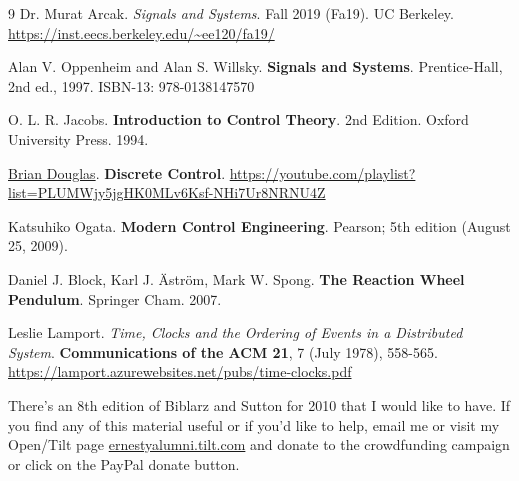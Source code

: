 \documentclass[10pt]{amsart}
\begin{document}
\begin{thebibliography}{9}
Dr. Murat Arcak. \emph{Signals and Systems}. Fall 2019 (Fa19). UC Berkeley. \url{https://inst.eecs.berkeley.edu/~ee120/fa19/}

Alan V. Oppenheim and Alan S. Willsky. \textbf{Signals and Systems}. Prentice-Hall, 2nd ed., 1997.  ISBN-13: 978-0138147570 

O. L. R. Jacobs. \textbf{Introduction to Control Theory}. 2nd Edition. Oxford University Press. 1994.

\href{https://www.youtube.com/channel/UCq0imsn84ShAe9PBOFnoIrg}{Brian Douglas}. \textbf{Discrete Control}. \url{https://youtube.com/playlist?list=PLUMWjy5jgHK0MLv6Ksf-NHi7Ur8NRNU4Z}

Katsuhiko Ogata. \textbf{Modern Control Engineering}. Pearson; 5th edition (August 25, 2009).

Daniel J. Block, Karl J. \"{A}str\"{o}m, Mark W. Spong. \textbf{The Reaction Wheel Pendulum}. Springer Cham. 2007.

Leslie Lamport. \emph{Time, Clocks and the Ordering of Events in a Distributed System}. \textbf{Communications of the ACM 21}, 7   (July 1978), 558-565. \url{https://lamport.azurewebsites.net/pubs/time-clocks.pdf} 
  
\end{thebibliography}
There's an 8th edition of Biblarz and Sutton \cite{GSuttonOBiblarz2001} for 2010 that I would like to have.  If you find any of this material useful or if you'd like to help, email me or visit my Open/Tilt page \url{ernestyalumni.tilt.com} and donate to the crowdfunding campaign or click on the PayPal donate button.  

\clearpage
\onecolumn






\newpage


%
\end{document}

